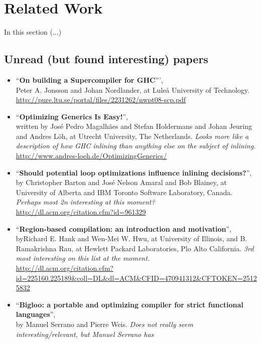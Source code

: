 
\section{Related Work}

In this section (...)

\subsection{Unread (but found interesting) papers}

\begin{itemize}
	\item ``\textbf{On building a Supercompiler for GHC}''', \\ Peter A. Jonsson
and Johan Nordlander, at Luleå University of Technology. \\
\url{http://pure.ltu.se/portal/files/2231262/nwpt08-scp.pdf}
	\item ``\textbf{Optimizing Generics Is Easy!}'', \\ written by José Pedro
Magalhães and Stefan Holdermans and Johan Jeuring and Andres Löh, at Utrecht
University, The Netherlands.
\textit{Looks more like a description of how GHC inlining than anything else on
the subject of inlining.}\\
\url{http://www.andres-loeh.de/OptimizingGenerics/}
	\item ``\textbf{Should potential loop optimizations influence inlining
decisions?}'', by Christopher Barton and José Nelson Amaral and Bob Blainey, at
University of Alberta and IBM Toronto Software Laboratory, Canada.
\textit{Perhaps most 2n interesting at this moment?}\\
\url{http://dl.acm.org/citation.cfm?id=961329}
	\item ``\textbf{Region-based compilation: an introduction and motivation}'',
\\ byRichard E. Hank and Wen-Mei W. Hwu, at University of Illinois, and B.
Ramakrishna Rau, at Hewlett Packard Laboratories, Plo Alto California.
\textit{3rd most interesting on this list at the moment.} \\
\url{http://dl.acm.org/citation.cfm?id=225160.225189&coll=DL&dl=ACM&CFID=470941312&CFTOKEN=25125832}
	\item ``\textbf{Bigloo: a portable and optimizing compiler for strict
functional languages}'', \\ by Manuel Serrano and Pierre Weis.
\textit{Does not really seem interesting/relevant, but Manuel Serrano has
}
\end{itemize}
